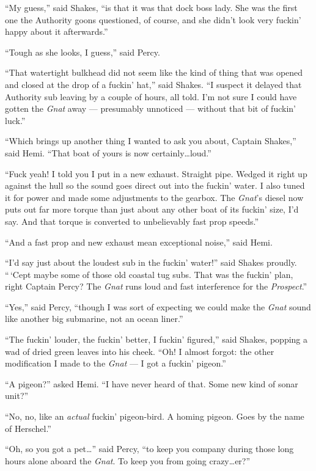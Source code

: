 \documentclass[
]{scrbook}
\begin{document}
``My guess,'' said Shakes, ``is that it was that dock boss lady. She was
the first one the Authority goons questioned, of course, and she didn't
look very fuckin' happy about it afterwards.''

``Tough as she looks, I guess,'' said Percy.

``That watertight bulkhead did not seem like the kind of thing that was
opened and closed at the drop of a fuckin' hat,'' said Shakes. ``I
suspect it delayed that Authority sub leaving by a couple of hours, all
told. I'm not sure I could have gotten the \emph{Gnat} away ---
presumably unnoticed --- without that bit of fuckin' luck.''

``Which brings up another thing I wanted to ask you about, Captain
Shakes,'' said Hemi. ``That boat of yours is now certainly\ldots loud.''

``Fuck yeah! I told you I put in a new exhaust. Straight pipe. Wedged it
right up against the hull so the sound goes direct out into the fuckin'
water. I also tuned it for power and made some adjustments to the
gearbox. The \emph{Gnat}'s diesel now puts out far more torque than just
about any other boat of its fuckin' size, I'd say. And that torque is
converted to unbelievably fast prop speeds.''

``And a fast prop and new exhaust mean exceptional noise,'' said Hemi.

``I'd say just about the loudest sub in the fuckin' water!'' said Shakes
proudly. ``\,`Cept maybe some of those old coastal tug subs. That was
the fuckin' plan, right Captain Percy? The \emph{Gnat} runs loud and
fast interference for the \emph{Prospect}.''

``Yes,'' said Percy, ``though I was sort of expecting we could make the
\emph{Gnat} sound like another big submarine, not an ocean liner.''

``The fuckin' louder, the fuckin' better, I fuckin' figured,'' said
Shakes, popping a wad of dried green leaves into his cheek. ``Oh! I
almost forgot: the other modification I made to the \emph{Gnat} --- I
got a fuckin' pigeon.''

``A pigeon?'' asked Hemi. ``I have never heard of that. Some new kind of
sonar unit?''

``No, no, like an \emph{actual} fuckin' pigeon-bird. A homing pigeon.
Goes by the name of Herschel.''

``Oh, so you got a pet\ldots{}'' said Percy, ``to keep you company
during those long hours alone aboard the \emph{Gnat}. To keep you from
going crazy\ldots er?''
\end{document}
